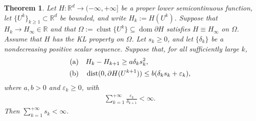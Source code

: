 \documentclass[9pt]{article}
\numberwithin{equation}{section}
\newtheorem{theorem}{Theorem}[section]
\theoremstyle{definition}
\theoremstyle{remark}
\newcommand{\R}{\mathbb R}
\DeclareMathOperator{\dist}{dist}
\DeclareMathOperator{\dom}{dom}
\DeclareMathOperator{\clust}{clust}
\begin{document}
\begin{theorem}\label{lem:scaled-KL}
Let $H:\R^d\to(-\infty,+\infty]$ be a proper lower semicontinuous
function, let $\{U^k\}_{k\ge 1}\subset\R^d$ be bounded, and write
$H_k:=H(U^k)$. Suppose that $H_k\to H_\infty\in\R$ and that
$\Omega:=\clust\{U^k\}\subseteq\dom\partial H$ satisfies
$H\equiv H_\infty$ on $\Omega$. Assume that $H$ has the KL property
on $\Omega$. Let $s_k\geq0$, and let $\{\delta_k\}$ be a
nondecreasing positive scalar sequence. Suppose that, for all
sufficiently large $k$,
\begin{eqnarray*}
\begin{aligned}
\textnormal{(a)}\quad&H_k-H_{k+1}\geq a\delta_ks_k^2,\\
\textnormal{(b)}\quad&\dist(0,\partial H(U^{k+1}))
 \leq b(\delta_ks_k+\varepsilon_k),
\end{aligned}
\end{eqnarray*}
where $a,b>0$ and $\varepsilon_k\geq0$, with
\begin{eqnarray}\label{eq:abstract-error-sum}
\sum_{k=1}^{+\infty}\frac{\varepsilon_k}{\delta_{k+1}}<\infty.
\end{eqnarray}
Then $\sum_{k=1}^{+\infty} s_k<\infty$.
\end{theorem}
\end{document}
